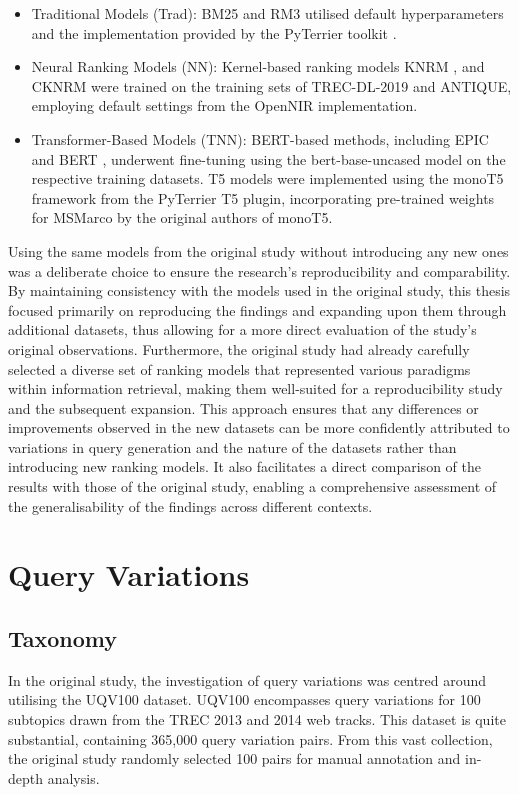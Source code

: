 \begin{itemize}
    \item Traditional Models (Trad): BM25 \cite{bm25} and RM3 \cite{rm3} utilised default hyperparameters and the implementation provided by the PyTerrier toolkit \cite{pyterrier}.
    \item Neural Ranking Models (NN): Kernel-based ranking models KNRM \cite{knrm}, and CKNRM \cite{cknrm} were trained on the training sets of TREC-DL-2019 and ANTIQUE, employing default settings from the OpenNIR \cite{opennir} implementation.
    \item Transformer-Based Models (TNN): BERT-based methods, including EPIC \cite{epic} and BERT \cite{bert}, underwent fine-tuning using the bert-base-uncased model on the respective training datasets. T5 \cite{t5} models were implemented using the monoT5 \cite{monot5} framework from the PyTerrier T5 plugin, incorporating pre-trained weights for MSMarco \cite{msmarco} by the original authors of monoT5.
\end{itemize}

Using the same models from the original study without introducing any new ones was a deliberate choice to ensure the research's reproducibility and comparability. By maintaining consistency with the models used in the original study, this thesis focused primarily on reproducing the findings and expanding upon them through additional datasets, thus allowing for a more direct evaluation of the study's original observations. Furthermore, the original study had already carefully selected a diverse set of ranking models that represented various paradigms within information retrieval, making them well-suited for a reproducibility study and the subsequent expansion. This approach ensures that any differences or improvements observed in the new datasets can be more confidently attributed to variations in query generation and the nature of the datasets rather than introducing new ranking models. It also facilitates a direct comparison of the results with those of the original study, enabling a comprehensive assessment of the generalisability of the findings across different contexts.

\section{Query Variations}
\subsection{Taxonomy}
In the original study, the investigation of query variations was centred around utilising the UQV100 \cite{uqv} dataset. UQV100 encompasses query variations for 100 subtopics drawn from the TREC 2013 and 2014 web tracks. This dataset is quite substantial, containing 365,000 query variation pairs. From this vast collection, the original study randomly selected 100 pairs for manual annotation and in-depth analysis.

